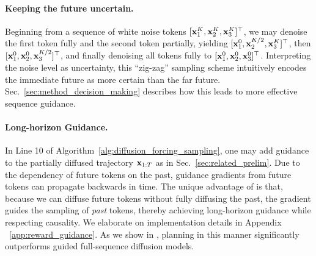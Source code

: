 \paragraph{Keeping the future uncertain.} 
\label{par:zigzag}
Beginning from a sequence of white noise tokens $[\mathbf{x}^K_1,\mathbf{x}^K_2,\mathbf{x}^K_3]^\top$, we may denoise the first token fully and the second token partially, yielding $[\mathbf{x}^0_1,\mathbf{x}^{K/2}_2,\mathbf{x}^K_3]^\top$, then $[\mathbf{x}^0_1,\mathbf{x}^{0}_2,\mathbf{x}^{K/2}_3]^\top$, and finally denoising all tokens fully to $[\mathbf{x}^0_1,\mathbf{x}^0_2,\mathbf{x}^0_3]^\top$. 
Interpreting the noise level as uncertainty, this ``zig-zag'' sampling scheme intuitively encodes the immediate future as more certain than the far future. Sec.~\ref{sec:method_decision_making} describes how this leads to more effective sequence guidance.

\paragraph{Long-horizon Guidance.}
In Line 10 of Algorithm~\ref{alg:diffusion_forcing_sampling}, one may add guidance to the partially diffused trajectory $\mathbf{x}_{1:T}$ as in Sec.~\ref{sec:related_prelim}. Due to the dependency of future tokens on the past, guidance gradients from future tokens can propagate backwards in time. The unique advantage of \algo{} is that, because we can diffuse future tokens without fully diffusing the past, the gradient guides the sampling of \emph{past} tokens, thereby achieving long-horizon guidance while respecting causality. We elaborate on implementation details in Appendix ~\ref{app:reward_guidance}. As we  show in , planning in this manner significantly outperforms guided full-sequence diffusion models.

